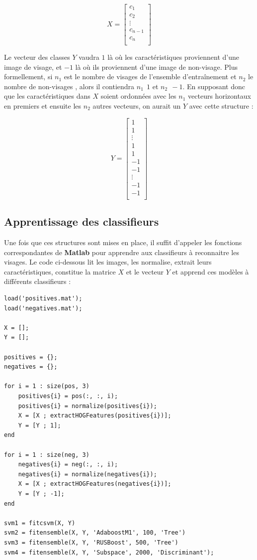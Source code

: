 \documentclass[11pt]{report}
\begin{document}
$$
X = 
\left[
\begin{array}{c}
c_{1} \\
c_{2} \\
\vdots \\
c_{n - 1} \\
c_{n} \\
\end{array}
\right]
$$

Le vecteur des classes $Y$ vaudra $1$ là où les caractéristiques proviennent d'une image de visage, et $-1$ là où ils proviennent d'une image de non-visage. Plus formellement, si $n_{1}$ est le nombre de visages de l'ensemble d'entraînement et $n_{2}$ le nombre de non-visages , alors il contiendra $n_{1} ~~ 1$ et $n_{2} ~~ -1$. En supposant donc que les caractéristiques dans $X$ soient ordonnées avec les $n_{1}$ vecteurs horizontaux en premiers et ensuite les $n_{2}$ autres vecteurs, on aurait un $Y$ avec cette structure : 

$$
Y = 
\left[
\begin{array}{c}
1 \\
1 \\
\vdots \\
1 \\
1 \\
-1 \\
-1 \\
\vdots \\
-1 \\
-1 \\
\end{array}
\right]
$$

\subsection*{Apprentissage des classifieurs}

Une fois que ces structures sont mises en place, il suffit d'appeler les fonctions correspondantes de \textbf{Matlab} pour apprendre aux classifieurs à reconnaitre les visages. Le code ci-dessous lit les images, les normalise, extrait leurs caractéristiques, constitue la matrice $X$ et le vecteur $Y$ et apprend ces modèles à différents classifieurs :

\begin{lstlisting}
load('positives.mat');
load('negatives.mat');

X = [];
Y = [];

positives = {};
negatives = {};

for i = 1 : size(pos, 3)
    positives{i} = pos(:, :, i);
    positives{i} = normalize(positives{i});
    X = [X ; extractHOGFeatures(positives{i})];
    Y = [Y ; 1];
end

for i = 1 : size(neg, 3)
    negatives{i} = neg(:, :, i);
    negatives{i} = normalize(negatives{i});
    X = [X ; extractHOGFeatures(negatives{i})];
    Y = [Y ; -1];
end

svm1 = fitcsvm(X, Y) 
svm2 = fitensemble(X, Y, 'AdaboostM1', 100, 'Tree')
svm3 = fitensemble(X, Y, 'RUSBoost', 500, 'Tree')
svm4 = fitensemble(X, Y, 'Subspace', 2000, 'Discriminant');
\end{lstlisting}
\end{document}
